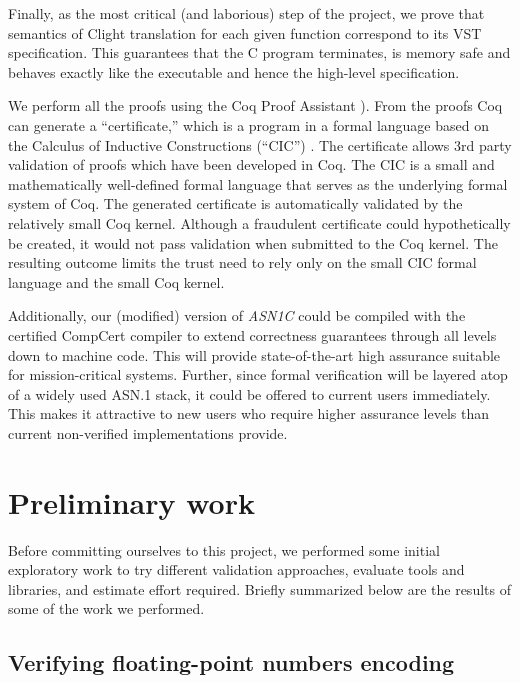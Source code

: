 \documentclass[10p,conference]{IEEEtran}
\begin{document}
Finally, as the most critical (and laborious) step of the project, we
prove that semantics of Clight
translation for each given function correspond to its VST specification. This guarantees that the C program terminates, is memory safe and behaves exactly like the executable and hence the high-level specification.



We perform all the proofs using the Coq Proof Assistant \cite{Coq}). From the
  proofs Coq can generate a ``certificate,'' which is a program in a
  formal language based on the Calculus of Inductive Constructions
  (``CIC'') \cite{CIC}. The certificate allows 3rd party
  validation of proofs which have been developed in Coq. The CIC is a small and mathematically
  well-defined formal language that serves as the underlying formal
  system of Coq. The generated certificate is automatically validated
  by the relatively small Coq kernel. Although a fraudulent
  certificate could hypothetically be created, it would not pass
  validation when submitted to the Coq kernel. The resulting outcome
  limits the trust need to rely only on the small CIC formal language and
  the small Coq kernel.

Additionally, our (modified) version of \emph{ASN1C} could be compiled with
the certified CompCert compiler \cite{CompCert} to extend correctness
guarantees through all levels down to machine code. This will provide state-of-the-art high
assurance suitable for mission-critical systems. Further, since formal
verification will be layered atop of a widely used ASN.1 stack, it
could be offered to current users immediately. This makes it attractive to new users who require higher
assurance levels than current non-verified implementations provide.

\section{Preliminary work}

Before committing ourselves to this project, we performed some initial
exploratory work to try different validation approaches, evaluate
tools and libraries, and estimate effort required. Briefly summarized
below are the results of some of the work we performed.

\subsection{Verifying floating-point numbers encoding}
\end{document}
